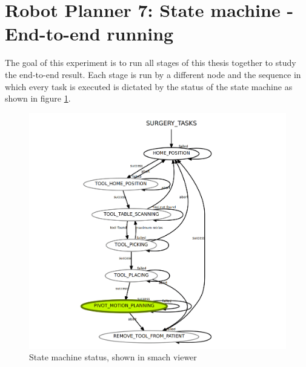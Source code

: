 \newpage
\section{Robot Planner 7: State machine - End-to-end running}
\label{section:robot-planner7}

The goal of this experiment is to run all stages of this thesis together to study the end-to-end result. Each stage is run by a different node and the sequence in which every task is executed is dictated by the status 
of the state machine as shown in figure \ref{smack-state-machine}.

\begin{center}
\begin{figure}[!htb]
\centering
\includegraphics[width=\textwidth]{images/state-machine-all-tasks.png}
\caption{State machine status, shown in smach viewer}
\label{smack-state-machine}
\end{figure}
\end{center}